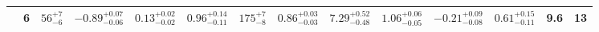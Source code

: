 \begin{table} [h]
\begin{center}
\begin{tabular}{c c c c c c c c c c c c c c}
& 6 & $     56 ^{+     7}_{-     6}$ & $  -0.89 ^{+  0.07}_{-  0.06}$ & $   0.13 ^{+  0.02}_{-  0.02}$ & $   0.96 ^{+  0.14}_{-  0.11}$ & $    175 ^{+     7}_{-     8}$ & $   0.86 ^{+  0.03}_{-  0.03}$ & $   7.29 ^{+  0.52}_{-  0.48}$ & $   1.06 ^{+  0.06}_{-  0.05}$ & $  -0.21 ^{+  0.09}_{-  0.08}$ & $  0.61 ^{+ 0.15}_{- 0.11}$ &    9.6 & 13 \\ 
\hline
\end{tabular}
\end{center}
\end{table}
%
